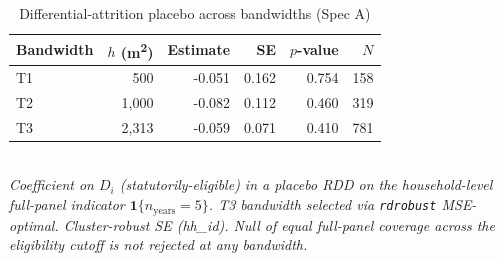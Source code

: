 \begin{table}[ht]
\centering
\caption{Differential-attrition placebo across bandwidths (Spec A)}
\label{tab:attrition-placebo-full}
\small
\setlength{\tabcolsep}{6pt}
\begin{tabular}{lrrrrr}
\toprule
Bandwidth & $h$ (m\textsuperscript{2}) & Estimate & SE & $p$-value & $N$ \\
\midrule
T1 & 500 & -0.051 & 0.162 & 0.754 & 158 \\
T2 & 1,000 & -0.082 & 0.112 & 0.460 & 319 \\
T3 & 2,313 & -0.059 & 0.071 & 0.410 & 781 \\
\bottomrule
\end{tabular}
\\
\footnotesize\textit{Coefficient on $D_i$ (statutorily-eligible) in a placebo RDD on the household-level full-panel indicator $\mathbf{1}\{n_{\text{years}}=5\}$. T3 bandwidth selected via \texttt{rdrobust} MSE-optimal. Cluster-robust SE (hh\_id). Null of equal full-panel coverage across the eligibility cutoff is not rejected at any bandwidth.}
\end{table}

